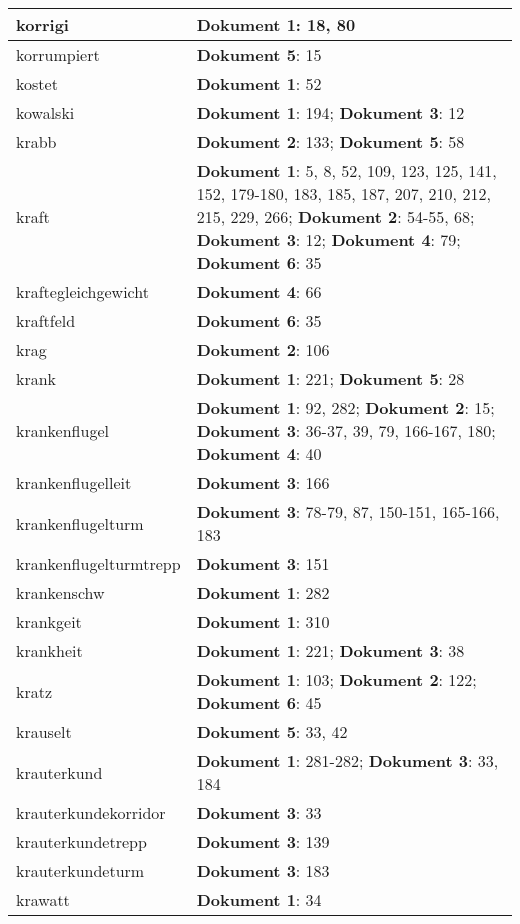 \documentclass[a5paper]{article}
\begin{document}
\begin{longtable}[l]{|l|p{3in}|}
\hline
korrigi & \textbf{Dokument 1}: 18, 80 \\
\hline
korrumpiert & \textbf{Dokument 5}: 15 \\
\hline
kostet & \textbf{Dokument 1}: 52 \\
\hline
kowalski & \textbf{Dokument 1}: 194; \textbf{Dokument 3}: 12 \\
\hline
krabb & \textbf{Dokument 2}: 133; \textbf{Dokument 5}: 58 \\
\hline
kraft & \textbf{Dokument 1}: 5, 8, 52, 109, 123, 125, 141, 152, 179-180, 183, 185, 187, 207, 210, 212, 215, 229, 266; \textbf{Dokument 2}: 54-55, 68; \textbf{Dokument 3}: 12; \textbf{Dokument 4}: 79; \textbf{Dokument 6}: 35 \\
\hline
kraftegleichgewicht & \textbf{Dokument 4}: 66 \\
\hline
kraftfeld & \textbf{Dokument 6}: 35 \\
\hline
krag & \textbf{Dokument 2}: 106 \\
\hline
krank & \textbf{Dokument 1}: 221; \textbf{Dokument 5}: 28 \\
\hline
krankenflugel & \textbf{Dokument 1}: 92, 282; \textbf{Dokument 2}: 15; \textbf{Dokument 3}: 36-37, 39, 79, 166-167, 180; \textbf{Dokument 4}: 40 \\
\hline
krankenflugelleit & \textbf{Dokument 3}: 166 \\
\hline
krankenflugelturm & \textbf{Dokument 3}: 78-79, 87, 150-151, 165-166, 183 \\
\hline
krankenflugelturmtrepp & \textbf{Dokument 3}: 151 \\
\hline
krankenschw & \textbf{Dokument 1}: 282 \\
\hline
krankgeit & \textbf{Dokument 1}: 310 \\
\hline
krankheit & \textbf{Dokument 1}: 221; \textbf{Dokument 3}: 38 \\
\hline
kratz & \textbf{Dokument 1}: 103; \textbf{Dokument 2}: 122; \textbf{Dokument 6}: 45 \\
\hline
krauselt & \textbf{Dokument 5}: 33, 42 \\
\hline
krauterkund & \textbf{Dokument 1}: 281-282; \textbf{Dokument 3}: 33, 184 \\
\hline
krauterkundekorridor & \textbf{Dokument 3}: 33 \\
\hline
krauterkundetrepp & \textbf{Dokument 3}: 139 \\
\hline
krauterkundeturm & \textbf{Dokument 3}: 183 \\
\hline
krawatt & \textbf{Dokument 1}: 34 \\

\end{longtable}
\end{document}
